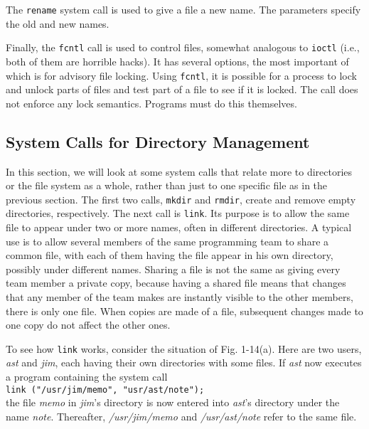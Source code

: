 \documentclass{book}
\newcommand {\sys} [1] {\textsl{#1}}
\newcommand {\cmd} [1] {\texttt{#1}}
\begin{document}
The \cmd{rename} system call is used to give a file a new name.
The parameters specify the old and new names.

Finally, the \cmd{fcntl} call is used to control files, somewhat analogous to \cmd{ioctl} (i.e., both of them are horrible hacks).
It has several options, the most important of which is for advisory file locking.
Using \cmd{fcntl}, it is possible for a process to lock and unlock parts of files and test part of a file to see if it is locked.
The call does not enforce any lock semantics.
Programs must do this themselves.

\subsection{System Calls for Directory Management}
In this section, we will look at some system calls that relate more to directories or the file system as a whole,
rather than just to one specific file as in the previous section.
The first two calls, \cmd{mkdir} and \cmd{rmdir}, create and remove empty directories, respectively.
The next call is \cmd{link}.
Its purpose is to allow the same file to appear under two or more names, often in different directories.
A typical use is to allow several members of the same programming team to share a common file, 
with each of them having the file appear in his own directory, possibly under different names.
Sharing a file is not the same as giving every team member a private copy, 
because having a shared file means that changes that any member of the team makes are instantly visible to the other members,
there is only one file.
When copies are made of a file, subsequent changes made to one copy do not affect the other ones.
 
To see how \cmd{link} works, consider the situation of Fig. 1-14(a).
Here are two users, \sys{ast} and \sys{jim}, each having their own directories with some files.
If \sys{ast} now executes a program containing the system call\\
\cmd{link ("/usr/jim/memo", "usr/ast/note");}\\
the file \sys{memo} in \sys{jim}'s directory is now entered into \sys{ast}'s directory under the name \sys{note}.
Thereafter, \sys{/usr/jim/memo} and \sys{/usr/ast/note} refer to the same file.
 
\end{document}
